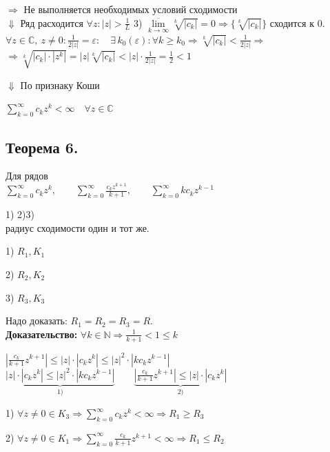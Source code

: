 \documentclass[a4paper,12pt]{article} %
\begin{document}
$\Rightarrow$ Не выполняется необходимых условий сходимости \\
\hspace*{3 cm} $\Downarrow$
Ряд расходится $\forall z: |z| > \frac{1}{L}$
3) $\overline{\lim\limits_{k \to \infty} }\sqrt[k]{|c_k|} = 0 \Rightarrow \{ \sqrt[k]{|c_k|}\}$ сходится к 0.\\
$\forall z \in \mathbb{C}, \   z \neq 0 : \frac{1}{2|z|} = \varepsilon: \quad  \exists \, k_0(\varepsilon) : \forall k \geqslant k_0 \Rightarrow \sqrt[k]{|c_k|} < \frac{1}{2|z|} \Rightarrow$
$\Rightarrow \sqrt[k]{|c_k|\cdot |z^k|} = |z|\sqrt[k]{|c_k|} < |z| \cdot \frac{1}{2|z|} = \frac{1}{2} < 1$ 

\hspace*{1 cm} $\Downarrow$ По признаку Коши

$\sum\limits_{k = 0}^\infty c_k z^k  < \infty \quad \forall z \in \mathbb{C}$

\subsection{Теорема 6.}
Для рядов \\
$\sum\limits_{k = 0}^\infty c_k z^k, \quad \quad \sum\limits_{k = 0}^\infty \frac{c_k z^{k + 1}}{k + 1}, \quad \quad \sum\limits_{k = 0}^\infty k c_k z^{k - 1} \quad$

\hspace*{0.5 cm}1) \hspace*{2.4 cm}2)\hspace*{2.7 cm}3)\\
радиус сходимости один и тот же.

1) $R_1, K_1$

2) $R_2, K_2$

3) $R_3, K_3$

Надо доказать: $R_1 = R_2 = R_3 = R$.\\
\textbf{Доказательство:}
$\forall k \in \mathbb{N} \Rightarrow \frac{1}{k + 1} < 1 \leqslant k$

$|\frac{c_k}{k + 1} z^{k + 1}| \leqslant |z| \cdot |c_k z^k| \leqslant |z|^2 \cdot |k c_k z^{k - 1}|$
$\underbrace{ |z| \cdot |c_k z^k| \leqslant |z|^2 \cdot |k c_k z^{k - 1}|}_{1)} \quad \quad \underbrace{|\frac{c_k}{k + 1} z^{k + 1}| \leqslant |z| \cdot |c_k z^k|}_{2)}$

1) $\forall z \neq 0 \in K_3 \Rightarrow \sum\limits_{k = 0}^\infty c_k z^k < \infty \Rightarrow R_1 \geqslant R_3$

2) $\forall z \neq 0 \in K_1 \Rightarrow \sum\limits_{k = 0}^\infty \frac{c_k}{k + 1} z^{k+1} < \infty \Rightarrow R_1 \leqslant R_2$
\end{document}
